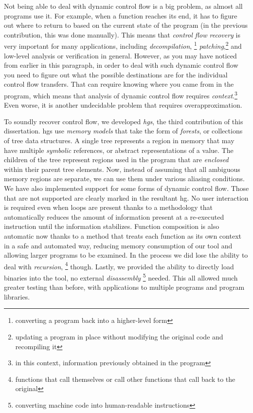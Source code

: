 {  Not being able to deal with dynamic control flow is a big problem, as almost all programs use it.
  For example, when a function reaches its end, it has to figure out where to return to based on the current state of the program (in the previous contribution, this was done manually).
  This means that \emph{control flow recovery} is very important for many applications, including \emph{decompilation},%
  \footnote{converting a program back into a higher-level form}
  \emph{patching},\footnote{updating a program in place without modifying the original code and recompiling it}
  and low-level analysis or verification in general.
  However, as you may have noticed from earlier in this paragraph, in order to deal with such dynamic control flow you need to figure out what the possible destinations are for the individual control flow transfers.
  That can require knowing where you came from in the program, which means that analysis of dynamic control flow requires \emph{context}.\footnote{in this context, information previously obtained in the program}
  Even worse, it is another undecidable problem that requires overapproximation.

  To soundly recover control flow, we developed \emph{\glspl{hg}}, the third contribution of this dissertation.
  \Glspl{hg} use \emph{memory models} that take the form of \emph{forests}, or collections of tree data structures.
  A single tree represents a region in memory that may have multiple \emph{symbolic} references, or abstract representations of a value.
  The children of the tree represent regions used in the program that are \emph{enclosed} within their parent tree elements.
  Now, instead of assuming that all ambiguous memory regions are separate, we can use them under various aliasing conditions.
  We have also implemented support for some forms of dynamic control flow.
  Those that are not supported are clearly marked in the resultant \gls{hg}.
  No user interaction is required even when loops are present thanks to a methodology that automatically reduces the amount of information present at a re-executed instruction until the information stabilizes.
  Function composition is also automatic now thanks to a method that treats each function as its own context in a safe and automated way, reducing memory consumption of our tool and allowing larger programs to be examined.
  In the process we did lose the ability to deal with \emph{recursion},%
  \footnote{functions that call themselves or call other functions that call back to the original}
  though.
  Lastly, we provided the ability to directly load binaries into the tool, no external \emph{disassembly}%
  \footnote{converting machine code into human-readable instructions}
  needed.
  This all allowed much greater testing than before, with applications to multiple programs and program libraries.

}

